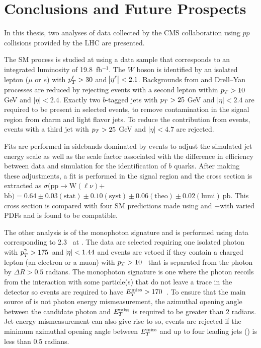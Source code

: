 
\chapter{Conclusions and Future Prospects}\label{sec:conclusion}

In this thesis, two analyses of data collected by the CMS
 collaboration using $pp$ collisions provided by the LHC are presented.

The SM process \ppwbblnbb is studied at  \TeV
 using a data sample that corresponds to an
 integrated luminosity of {19.8~fb$^{-1}$}.
The $W$ boson is identified by an isolated lepton ($\mu$ or $e$)
 with $p_T^\ell>30$ \GeV and $\abs{\eta^\ell}<2.1$.
Backgrounds from \ppttbar and Drell--Yan processes
 are reduced by rejecting events with a second lepton 
 within {$p_T > 10$} GeV and {$|\eta| < 2.4$}.
Exactly two $b$-tagged jets with
 {$p_T > 25$} GeV and {$|\eta| < 2.4$} are required
 to be present in selected events, to  
 remove contamination in the signal region from 
 charm and light flavor jets.
To reduce the contribution from \ppttbar events,
 events  with
 a third jet with {$p_T > 25$} GeV and {$|\eta| < 4.7$}
 are rejected.

Fits are performed in sidebands dominated by \ttbar
 events  to adjust the  simulated jet energy scale
 as well as the
 scale factor associated with the difference in
 efficiency between data and simulation for the identification of $b$ quarks.
After making these adjustments, a fit is performed in the
 signal region and the cross section is extracted as
{$\sigma ( {\mathrm{pp}} \rightarrow {\mathrm{W}} (\ell\nu)$+$\mathrm{b}\overline{\mathrm{b}})= 0.64 \pm 0.03 \mathrm{(stat)} \pm 0.10 \mathrm{(syst)} \pm 0.06 \mathrm{(theo)} \pm 0.02 \mathrm{(lumi)} ~\mathrm{pb}$}.
This cross section is compared with four SM predictions made using
 \MCFM and \MADGRAPH+\PYTHIA with varied PDFs and is
 found to be compatible.

The other analysis is of the monophoton signature
 and is performed using data corresponding to 2.3~\fbinv
 at  \TeV.
The data are selected requiring one isolated photon
 with $p_T^\gamma>175$~\GeV and $\abs{\eta} < 1.44$ and
 events are vetoed if they contain 
 a charged lepton (an electron or a muon) with $p_T >10$~\GeV
 that is separated from the photon by $\Delta R > 0.5$ radians.
The monophoton signature is one where the 
 photon recoils from the interaction with some
 particle(s) that do not leave a trace in the detector
 so events are required to have $E_T^{\mathrm{miss}} > 170$~\GeV.
To ensure that the main source of \met is
 not photon energy mismeasurement, 
 the azimuthal opening
 angle between the candidate photon and $E_T^{\mathrm{miss}}$ is required to be
 greater than 2 radians.
Jet energy mismeasurement can also
 give rise to \met so, events are rejected if the minimum azimuthal opening
 angle between $E_T^{\mathrm{miss}}$ and up to four leading jets (\minDphiMETj) is
 less than 0.5 radians.

